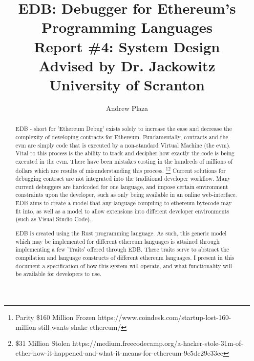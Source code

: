 \documentclass{report}
\title{%
    EDB: Debugger for Ethereum's Programming Languages \\
	\medskip
	\large Report \#4: System Design \\
    \large Advised by Dr. Jackowitz	\\
	\large University of Scranton}
\author{Andrew Plaza}
\begin{document}
\maketitle
\tableofcontents
\newpage

\begin{abstract}
    EDB - short for 'Ethereum Debug' exists solely to increase the ease and decrease the complexity of developing \Glspl{contract} for Ethereum. Fundamentally, \Glspl{contract} and the \Gls{evm} are simply code that is executed by a non-standard Virtual Machine (the \Gls{evm}). Vital to this process is the ability to track and decipher how exactly the code is being executed in the \Gls{evm}. There have been mistakes costing in the hundreds of millions of dollars which are results of misunderstanding this process. \footnote{Parity \$160 Million Frozen https://www.coindesk.com/startup-lost-160-million-still-wants-shake-ethereum/}\footnote{\$31 Million Stolen https://medium.freecodecamp.org/a-hacker-stole-31m-of-ether-how-it-happened-and-what-it-means-for-ethereum-9e5dc29e33ce} Current solutions for debugging \gls{contract} are not integrated into the traditional developer workflow. Many current debuggers are hardcoded for one language, and impose certain environment constraints upon the developer, such as only being available in an online web-interface. EDB aims to create a model that any language compiling to \Gls{ethereum} bytecode may fit into, as well as a model to allow extensions into different developer environments (such as Visual Studio Code).

    EDB is created using the Rust programming language. As such, this generic model which may be implemented for different \Gls{ethereum} languages is attained through implementing a few 'Traits' offered through EDB. These traits serve to abstract the compilation and language constructs of different \Gls{ethereum} languages. I present in this document a specification of how this system will operate, and what functionality will be available for developers to use.
\end{abstract}

\newpage
\end{document}
